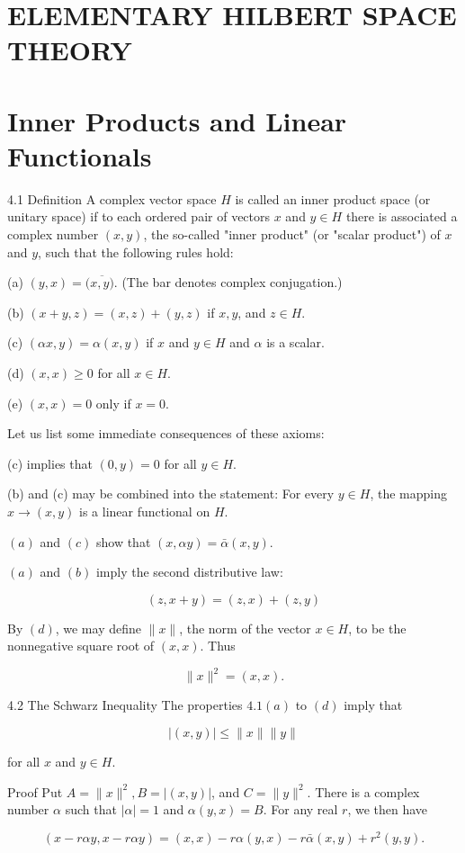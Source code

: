 \documentclass[10pt]{article}
\begin{document}
\section{ELEMENTARY HILBERT SPACE THEORY}
\section{Inner Products and Linear Functionals}
4.1 Definition A complex vector space $H$ is called an inner product space (or unitary space) if to each ordered pair of vectors $x$ and $y \in H$ there is associated a complex number $(x, y)$, the so-called "inner product" (or "scalar product") of $x$ and $y$, such that the following rules hold:

(a) $(y, x)=(\overline{x, y)}$. (The bar denotes complex conjugation.)

(b) $(x+y, z)=(x, z)+(y, z)$ if $x, y$, and $z \in H$.

(c) $(\alpha x, y)=\alpha(x, y)$ if $x$ and $y \in H$ and $\alpha$ is a scalar.

(d) $(x, x) \geq 0$ for all $x \in H$.

(e) $(x, x)=0$ only if $x=0$.

Let us list some immediate consequences of these axioms:

(c) implies that $(0, y)=0$ for all $y \in H$.

(b) and (c) may be combined into the statement: For every $y \in H$, the mapping $x \rightarrow(x, y)$ is a linear functional on $H$.

$(a)$ and $(c)$ show that $(x, \alpha y)=\bar{\alpha}(x, y)$.

$(a)$ and $(b)$ imply the second distributive law:

$$
(z, x+y)=(z, x)+(z, y)
$$

By $(d)$, we may define $\|x\|$, the norm of the vector $x \in H$, to be the nonnegative square root of $(x, x)$. Thus

$$
\|x\|^{2}=(x, x) .
$$

4.2 The Schwarz Inequality The properties $4.1(a)$ to $(d)$ imply that

$$
|(x, y)| \leq\|x\|\|y\|
$$

for all $x$ and $y \in H$.

Proof Put $A=\|x\|^{2}, B=|(x, y)|$, and $C=\|y\|^{2}$. There is a complex number $\alpha$ such that $|\alpha|=1$ and $\alpha(y, x)=B$. For any real $r$, we then have

$$
(x-r \alpha y, x-r \alpha y)=(x, x)-r \alpha(y, x)-r \bar{\alpha}(x, y)+r^{2}(y, y) .
$$
\end{document}
